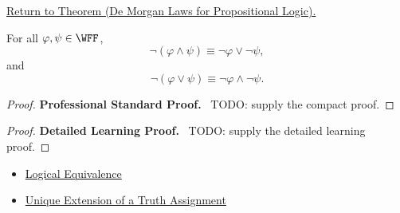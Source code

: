 \newpage
{}
\label{prf:de-morgan-laws-propositional-logic}

\begin{remark*}[Return]
\hyperref[thm:de-morgan-laws-propositional-logic]{Return to Theorem (De Morgan Laws for Propositional Logic).}
\end{remark*}

\begin{theorem*}
For all \(\varphi,\psi\in\WFF\),
\[
\neg(\varphi\land\psi)
\equiv
\neg\varphi\lor\neg\psi,
\]
and
\[
\neg(\varphi\lor\psi)
\equiv
\neg\varphi\land\neg\psi.
\]
\end{theorem*}

\begin{proof}
\textbf{Professional Standard Proof.}~
TODO: supply the compact proof.
\end{proof}

\begin{proof}
\textbf{Detailed Learning Proof.}~
TODO: supply the detailed learning proof.
\end{proof}

\begin{remark*}
\end{remark*}

\begin{dependencies}
\begin{itemize}
  \item \hyperref[def:logical-equivalence-propositional-logic]{Logical Equivalence}
  \item \hyperref[thm:unique-extension-truth-assignment-propositional-logic]{Unique Extension of a Truth Assignment}
\end{itemize}
\end{dependencies}

\clearpage
